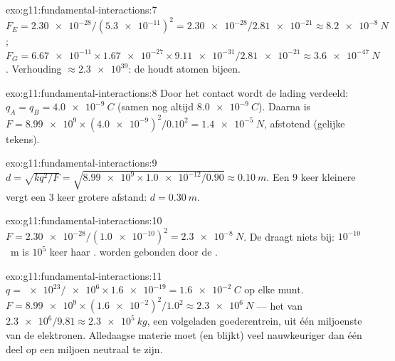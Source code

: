 \begin{solution}{exo:g11:fundamental-interactions:7}
$F_E = \num{2.30e-28}/(\num{5.3e-11})^2 = \num{2.30e-28}/\num{2.81e-21}
\approx \qty{8.2e-8}{N}$;
$F_G = \num{6.67e-11} \times \num{1.67e-27} \times \num{9.11e-31} /
\num{2.81e-21} \approx \qty{3.6e-47}{N}$. Verhouding
$\approx \num{2.3e39}$: de  houdt atomen
bijeen.
\end{solution}

\begin{solution}{exo:g11:fundamental-interactions:8}
Door het contact wordt de lading verdeeld:
$q_A = q_B = \qty{+4.0e-9}{C}$ (samen nog altijd $\qty{8.0e-9}{C}$).
Daarna is $F = \num{8.99e9} \times (\num{4.0e-9})^2/0.10^2 =
\qty{1.4e-5}{N}$, afstotend (gelijke tekens).
\end{solution}

\begin{solution}{exo:g11:fundamental-interactions:9}
$d = \sqrt{k q^2/F} = \sqrt{\num{8.99e9} \times \num{1.0e-12}/0.90}
\approx \qty{0.10}{m}$. Een $9$ keer kleinere  vergt een $3$ keer
grotere afstand: $d = \qty{0.30}{m}$.
\end{solution}

\begin{solution}{exo:g11:fundamental-interactions:10}
$F = \num{2.30e-28}/(\num{1.0e-10})^2 = \qty{2.3e-8}{N}$. De  draagt niets bij: $10^{-10}$~m is $10^{5}$ keer haar
.  worden gebonden door de .
\end{solution}

\begin{solution}{exo:g11:fundamental-interactions:11}
$q = \num{e23}/\num{e6} \times \num{1.6e-19} = \qty{1.6e-2}{C}$ op elke
munt. $F = \num{8.99e9} \times (\num{1.6e-2})^2/1.0^2 \approx
\qty{2.3e6}{N}$ --- het  van $\num{2.3e6}/9.81 \approx
\qty{2.3e5}{kg}$, een volgeladen goederentrein, uit één miljoenste van
de elektronen. Alledaagse materie moet (en blijkt) veel nauwkeuriger dan
één deel op een miljoen neutraal te zijn.
\end{solution}

